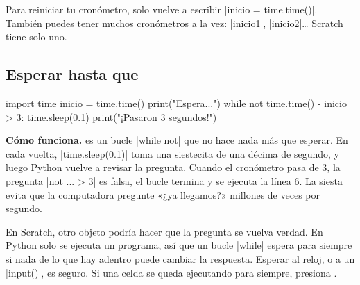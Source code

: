 \begin{think}
Para reiniciar tu cronómetro, solo vuelve a escribir \py|inicio = time.time()|. También puedes tener muchos cronómetros a la vez: \py|inicio1|, \py|inicio2|\ldots{} Scratch tiene solo uno.
\end{think}

\subsection*{Esperar hasta que}

\begin{tcbraster}[raster columns=2, raster equal height=rows, raster column skip=12pt, raster valign=center, raster force size=false, raster column 1/.style={width=0.36\linewidth}, raster column 2/.style={width=0.64\linewidth-12pt}]
\begin{tcolorbox}[colback=white, colframe=white, boxrule=0pt, valign=center, left=0pt, right=0pt]
\begin{scratch}[scale=0.74]
\end{scratch}
\end{tcolorbox}
\begin{code}
import time
inicio = time.time()
print("Espera...")
while not time.time() - inicio > 3:
    time.sleep(0.1)
print("¡Pasaron 3 segundos!")
\end{code}
\end{tcbraster}

\textbf{Cómo funciona.}  es un bucle \py|while not| que no hace nada más que esperar. En cada vuelta, \py|time.sleep(0.1)| toma una siestecita de una décima de segundo, y luego Python vuelve a revisar la pregunta. Cuando el cronómetro pasa de 3, la pregunta \py|not ... > 3| es falsa, el bucle termina y se ejecuta la línea 6. La siesta evita que la computadora pregunte «¿ya llegamos?» millones de veces por segundo.

\begin{watchout}
En Scratch, otro objeto podría hacer que la pregunta se vuelva verdad. En Python solo se ejecuta un programa, así que un bucle \py|while| espera para siempre si nada de lo que hay adentro puede cambiar la respuesta. Esperar al reloj, o a un \py|input()|, es seguro. Si una celda se queda ejecutando para siempre, presiona \stopbtn.
\end{watchout}

